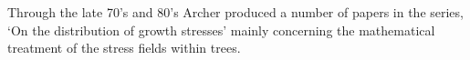 Through the late 70's and 80's Archer produced a number of papers in the series,
`On the distribution of growth stresses' \citep{Archer_1974,archer1976,Archer_1979,Archer_1981,Archer_1985} mainly concerning the
mathematical treatment of the stress fields within trees. 